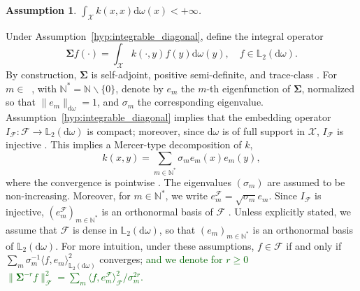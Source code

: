 \documentclass[twoside,11pt]{book}
\newcommand{\rev}[1]{\textcolor{darkgreen}{#1}}
\newtheorem{assumption}{Assumption}
\numberwithin{theorem}{chapter}
\numberwithin{definition}{chapter}
\numberwithin{proposition}{chapter}
\numberwithin{corollary}{chapter}
\numberwithin{example}{chapter}
\numberwithin{lemma}{chapter}
\DeclareMathOperator{\Span}{\mathrm{Span}}
\DeclareMathOperator{\X}{\mathcal{X}}
\DeclareMathOperator{\Ns}{\mathbb{N}^{*}}
\newcommand{\rb}[1]{\textcolor{magenta}{#1}}
\begin{document}

\begin{assumption}\label{CVS_hyp:integrable_diagonal}
$\displaystyle \int_{\X} k(x,x) \mathrm{d}\omega(x) < +\infty$.
\end{assumption}
Under Assumption~\ref{hyp:integrable_diagonal}, define the integral operator
\begin{equation}
\bm{\Sigma} f (\cdot) = \int_{\mathcal{X}} k(\cdot,y)f(y) \mathrm{d}\omega(y), \quad f \in \mathbb{L}_{2}(\mathrm{d}\omega).
\end{equation}
By construction, $\bm{\Sigma}$ is self-adjoint, positive semi-definite, and trace-class \citep{Sim05}.
%
For $m \in \Ns$, with $\mathbb{N}^{*} = \mathbb{N} \smallsetminus \{0\}$, denote by $e_{m}$ the $m$-th eigenfunction of $\bm{\Sigma}$, normalized so that $\|e_{m}\|_{\mathrm{d}\omega} = 1$, and $\sigma_{m}$ the corresponding eigenvalue. Assumption~\ref{hyp:integrable_diagonal} implies that the embedding operator $I_{\mathcal{F}}: \mathcal{F} \longrightarrow \mathbb{L}_{2}(\mathrm{d}\omega)$ is compact; moreover, since $\mathrm{d}\omega$ is of full support in $\mathcal{X}$, $I_{\mathcal{F}}$ is injective \citep{StCh08}. This implies a Mercer-type decomposition of $k$,
\begin{equation}
\label{CVS_eq:Mercer_decomp}
	k(x,y)= \sum\limits_{m \in \mathbb{N}^{*}}\sigma_{m}e_{m}(x)e_{m}(y),
\end{equation}
where the convergence is pointwise \citep{StSc12}. The eigenvalues $(\sigma_m)$ are assumed to be non-increasing. Moreover, for $m \in \mathbb{N}^{*}$, we write $e_{m}^{\mathcal{F}} = \sqrt{\sigma_{m}}e_{m}$. Since $I_{\mathcal{F}}$ is injective, $(e_{m}^{\mathcal{F}})_{m \in \mathbb{N}^{*}}$ is an orthonormal basis of $\mathcal{F}$ \citep{StSc12}. Unless explicitly stated, we assume that $\mathcal{F}$ is dense in $\mathbb{L}_{2}(\mathrm{d}\omega)$, so that $(e_{m})_{m \in \mathbb{N}^{*}}$ is an orthonormal basis of $\mathbb{L}_{2}(\mathrm{d}\omega)$. For more intuition, under these assumptions, $f \in \mathcal{F}$ if and only if $\sum_m \sigma_{m}^{-1} \langle f,e_{m} \rangle_{\mathbb{L}_{2}(\mathrm{d} \omega)}^{2}$ converges; \rev{ and we denote for $r\geq 0$ $\|\bm{\Sigma}^{-r}f\|_{\mathcal{F}}^{2} = \sum_{m} \langle f,e_{m}^{\mathcal{F}} \rangle_{\mathcal{F}}^{2}/\sigma_{m}^{2r}$.}
\end{document}
